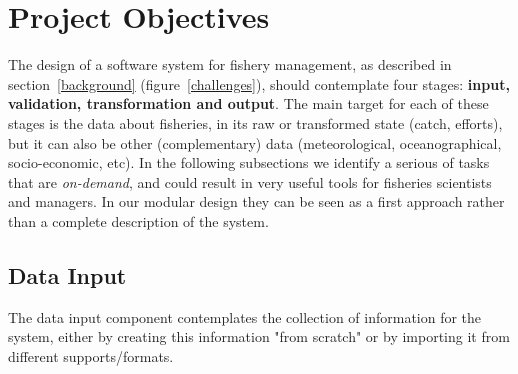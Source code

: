 \documentclass[11pt]{article} %
\begin{document}
\clearpage

\section{Project Objectives}\label{objectives}
The design of a software system for fishery management, as described in section~\ref{background} (figure~\ref{challenges}), should contemplate four stages:
\textbf{input, validation, transformation and output}. The main target for each of these stages is the data about fisheries, in its raw or transformed state (catch, efforts), but it can also be other (complementary) data (meteorological, oceanographical, socio-economic, etc). In the following subsections we identify a serious of tasks that are \textit{on-demand}, and could result in very useful tools for fisheries scientists and managers. %
In our modular design they can be seen as a first approach rather than a complete description of the system.\\

\subsection{Data Input}\label{input}
The data input component contemplates the collection of information for the system, either by creating this information "from scratch" or by importing it from different supports/formats.
\end{document}
